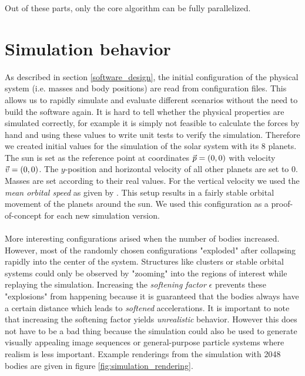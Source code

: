 \documentclass[a4paper,11pt]{scrartcl} %
\newcommand*{\vv}[1]{\vec{\mkern0mu#1}}
\begin{document}
Out of these parts, only the core algorithm can be fully parallelized.

\newpage


\section{Simulation behavior}
As described in section \ref{software_design}, the initial configuration of the physical system (i.e. masses and body positions) are read from configuration files. This allows us to rapidly simulate and evaluate different scenarios without the need to build the software again. It is hard to tell whether the physical properties are simulated correctly, for example it is simply not feasible to calculate the forces by hand and using these values to write unit tests to verify the simulation. Therefore we created initial values for the simulation of the solar system with its 8 planets. The sun is set as the reference point at coordinates $\vv{p}=(0,0)$ with velocity $\vv{v}=(0,0)$. The $y$-position and horizontal velocity of all other planets are set to 0. Masses are set according to their real values. For the vertical velocity we used the \textit{mean orbital speed} as given by \cite{wikiplanets}. This setup results in a fairly stable orbital movement of the planets around the sun. We used this configuration as a proof-of-concept for each new simulation version.\\\\
More interesting configurations arised when the number of bodies increased. However, most of the randomly chosen configurations "exploded" after collapsing rapidly into the center of the system. Structures like clusters or stable orbital systems could only be observed by "zooming" into the regions of interest while replaying the simulation. Increasing the \textit{softening factor} $\epsilon$ prevents these "explosions" from happening because it is guaranteed that the bodies always have a certain distance which leads to \textit{softened} accelerations. It is important to note that increasing the softening factor yields \textit{unrealistic} behavior. However this does not have to be a bad thing because the simulation could also be used to generate visually appealing image sequences or general-purpose particle systems where realism is less important. Example renderings from the simulation with 2048 bodies are given in figure \ref{fig:simulation_rendering}.
\end{document}
